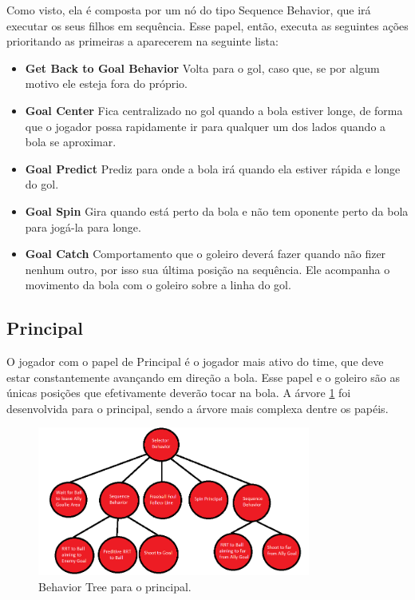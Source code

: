 \documentclass[conference]{IEEEtran}
\begin{document}
Como visto, ela é composta por um nó do tipo Sequence Behavior, que irá executar os seus filhos em sequência. Esse papel, então, executa as seguintes ações prioritando as primeiras a aparecerem na seguinte lista:

\begin{itemize}

\item \textbf{Get Back to Goal Behavior} Volta para o gol, caso que, se por algum motivo ele esteja fora do próprio.

\item \textbf{Goal Center} Fica centralizado no gol quando a bola estiver longe, de forma que o jogador possa rapidamente ir para qualquer um dos lados quando a bola se aproximar.

\item \textbf{Goal Predict} Prediz para onde a bola irá quando ela estiver rápida e longe do gol.

\item \textbf{Goal Spin} Gira quando está perto da bola e não tem oponente perto da bola para jogá-la para longe.

\item \textbf{Goal Catch} Comportamento que o goleiro deverá fazer quando não fizer nenhum outro, por isso sua última posição na sequência. Ele acompanha o movimento da bola com o goleiro sobre a linha do gol.

\end{itemize}



\subsection{Principal}

O jogador com o papel de Principal é o jogador mais ativo do time, que deve estar constantemente avançando em direção a bola. Esse papel e o goleiro são as únicas posições que efetivamente deverão tocar na bola. A árvore \ref{fig:principal_bt} foi desenvolvida para o principal, sendo a árvore mais complexa dentre os papéis.

\begin{figure}[H]
	\centering
	\includegraphics[width=0.8\textwidth]{figures/Principal_BT.png}
   	\caption{Behavior Tree para o principal.} \label{fig:principal_bt}
\end{figure}   
\end{document}
